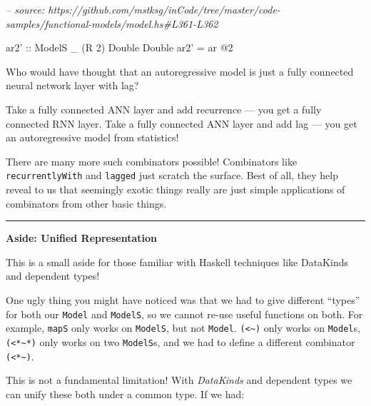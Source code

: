 \documentclass[]{article}
\newenvironment{Shaded}{}{}
\newcommand{\CommentTok}[1]{\textcolor[rgb]{0.38,0.63,0.69}{\textit{#1}}}
\newcommand{\DataTypeTok}[1]{\textcolor[rgb]{0.56,0.13,0.00}{#1}}
\newcommand{\DecValTok}[1]{\textcolor[rgb]{0.25,0.63,0.44}{#1}}
\newcommand{\FunctionTok}[1]{\textcolor[rgb]{0.02,0.16,0.49}{#1}}
\newcommand{\NormalTok}[1]{#1}
\newcommand{\OtherTok}[1]{\textcolor[rgb]{0.00,0.44,0.13}{#1}}
\begin{document}
\begin{Shaded}
\begin{Highlighting}[]
\CommentTok{-- source: https://github.com/mstksg/inCode/tree/master/code-samples/functional-models/model.hs#L361-L362}

\OtherTok{ar2' ::} \DataTypeTok{ModelS}\NormalTok{ _ (}\DataTypeTok{R} \DecValTok{2}\NormalTok{) }\DataTypeTok{Double} \DataTypeTok{Double}
\NormalTok{ar2' }\FunctionTok{=}\NormalTok{ ar }\FunctionTok{@}\DecValTok{2}
\end{Highlighting}
\end{Shaded}

Who would have thought that an autoregressive model is just a fully connected
neural network layer with lag?

Take a fully connected ANN layer and add recurrence --- you get a fully
connected RNN layer. Take a fully connected ANN layer and add lag --- you get an
autoregressive model from statistics!

There are many more such combinators possible! Combinators like
\texttt{recurrentlyWith} and \texttt{lagged} just scratch the surface. Best of
all, they help reveal to us that seemingly exotic things really are just simple
applications of combinators from other basic things.

\begin{center}\rule{0.5\linewidth}{\linethickness}\end{center}

\textbf{Aside: Unified Representation}

This is a small aside for those familiar with Haskell techniques like DataKinds
and dependent types!

One ugly thing you might have noticed was that we had to give different
``types'' for both our \texttt{Model} and \texttt{ModelS}, so we cannot re-use
useful functions on both. For example, \texttt{mapS} only works on
\texttt{ModelS}, but not \texttt{Model}. \texttt{(\textless{}\textasciitilde{})}
only works on \texttt{Model}s, \texttt{(\textless{}*\textasciitilde{}*)} only
works on two \texttt{ModelS}s, and we had to define a different combinator
\texttt{(\textless{}*\textasciitilde{})}.

This is not a fundamental limitation! With \emph{DataKinds} and dependent types
we can unify these both under a common type. If we had:
\end{document}
